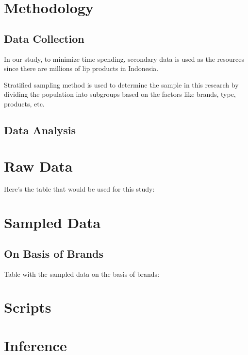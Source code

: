 \documentclass{article}
\begin{document}
          \section{Methodology}
        \subsection{Data Collection}
            In our study, to minimize time spending, secondary data is used as the resources since there are millions of lip products in Indonesia.

            Stratified sampling method is used to determine the sample in this research by dividing the population into subgroups based on the factors like brands, type, products, etc. 

        \subsection{Data Analysis}

    \section{Raw Data}
    Here's the table that would be used for this study:
    
    
    \section{Sampled Data}  
        \subsection{On Basis of Brands}
        Table with the sampled data on the basis of brands:  
    \section{Scripts}
    \section{Inference}

	\newpage
	
	
	
\end{document}
